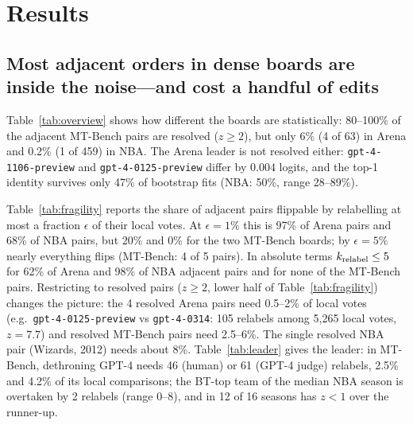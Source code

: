 \documentclass{article}
\begin{document}
\section{Results}
\subsection{Most adjacent orders in dense boards are inside the noise---and cost a handful of edits}
Table~\ref{tab:overview} shows how different the boards are statistically: 80--100\% of the adjacent MT-Bench pairs are resolved ($z\geq2$), but only 6\% (4 of 63) in Arena and 0.2\% (1 of 459) in NBA. The Arena leader is not resolved either: \texttt{gpt-4-1106-preview} and \texttt{gpt-4-0125-preview} differ by $0.004$ logits, and the top-1 identity survives only 47\% of bootstrap fits (NBA: 50\%, range 28--89\%).

Table~\ref{tab:fragility} reports the share of adjacent pairs flippable by relabelling at most a fraction $\epsilon$ of their local votes. At $\epsilon=1\%$ this is 97\% of Arena pairs and 68\% of NBA pairs, but 20\% and 0\% for the two MT-Bench boards; by $\epsilon=5\%$ nearly everything flips (MT-Bench: 4 of 5 pairs). In absolute terms $k_{\rm relabel}\leq5$ for 62\% of Arena and 98\% of NBA adjacent pairs and for none of the MT-Bench pairs. Restricting to resolved pairs ($z\geq2$, lower half of Table~\ref{tab:fragility}) changes the picture: the 4 resolved Arena pairs need 0.5--2\% of local votes (e.g.\ \texttt{gpt-4-0125-preview} vs \texttt{gpt-4-0314}: 105 relabels among 5{,}265 local votes, $z=7.7$) and resolved MT-Bench pairs need 2.5--6\%. The single resolved NBA pair (Wizards, 2012) needs about 8\%. Table~\ref{tab:leader} gives the leader: in MT-Bench, dethroning GPT-4 needs 46 (human) or 61 (GPT-4 judge) relabels, 2.5\% and 4.2\% of its local comparisons; the BT-top team of the median NBA season is overtaken by 2 relabels (range 0--8), and in 12 of 16 seasons has $z<1$ over the runner-up.

\begin{table}[t]
\caption{Share (\%) of adjacent pairs that a relabelling adversary can flip using at most a fraction $\epsilon$ of the votes involving the two contestants. 95\% bootstrap intervals; tiny $n$ (MT-Bench: 5 pairs) makes the intervals wide.}\label{tab:fragility}
\centering\scriptsize
\resizebox{\textwidth}{!}{}
\end{table}
\begin{table}[t]
\caption{The top-ranked contestant vs.\ rank 2: gap, bootstrap $z$, local votes, and edits needed to reverse (relabel / remove). NBA: median over seasons (range).}\label{tab:leader}
\centering\scriptsize
\resizebox{\textwidth}{!}{}
\end{table}
\end{document}
